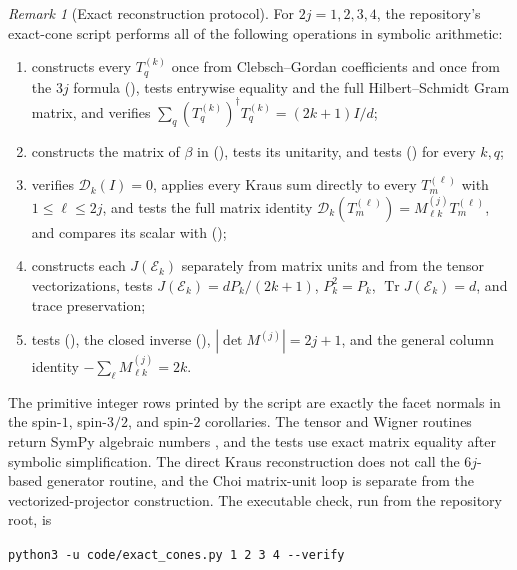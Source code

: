 \documentclass[twoside,10pt]{article}
\numberwithin{equation}{section}
\theoremstyle{slbody}
\theoremstyle{definition}
\theoremstyle{remark}
\newtheorem{remark}[theorem]{Remark}
\newcommand{\Tr}{\operatorname{Tr}}
\newcommand{\cD}{\mathcal D}
\newcommand{\cE}{\mathcal E}
\renewcommand{\eqref}[1]{%
  \textup{{\normalfont(\oldstylenums{\ref{#1}}}\normalfont)}}
\begin{document}
\begin{remark}[Exact reconstruction protocol]
For \(2j=1,2,3,4\), the repository's exact-cone script performs all of
the following operations in symbolic arithmetic:
\begin{enumerate}
 \item constructs every \(T_q^{(k)}\) once from Clebsch--Gordan
 coefficients and once from the \(3j\) formula
 \eqref{eq:tensor-definition}, tests entrywise equality and the full
 Hilbert--Schmidt Gram matrix, and verifies
 \(\sum_q(T_q^{(k)})^\dagger T_q^{(k)}=(2k+1)I/d\);
 \item constructs the matrix of \(\beta\) in
 \eqref{eq:dual-intertwiner}, tests its unitarity, and tests
 \eqref{eq:dual-tensor-phase} for every \(k,q\);
 \item verifies \(\cD_k(I)=0\), applies every Kraus sum directly to
 every \(T_m^{(\ell)}\) with \(1\leq\ell\leq2j\), and tests the full
 matrix identity
 \(\cD_k(T_m^{(\ell)})=M^{(j)}_{\ell k}T_m^{(\ell)}\), and compares
 its scalar with \eqref{eq:M-definition};
 \item constructs each \(J(\cE_k)\) separately from matrix units and
 from the tensor vectorizations, tests
 \(J(\cE_k)=dP_k/(2k+1)\), \(P_k^2=P_k\),
 \(\Tr J(\cE_k)=d\), and trace preservation;
 \item tests \eqref{eq:M-from-vertices}, the closed inverse
 \eqref{eq:M-inverse-formula}, \(|\det M^{(j)}|=2j+1\), and the
 general column identity \(-\sum_\ell M^{(j)}_{\ell k}=2k\).
\end{enumerate}
The primitive integer rows printed by the script are exactly the facet
normals in the spin-\(1\), spin-\(3/2\), and spin-\(2\) corollaries.
The tensor and Wigner routines return SymPy algebraic numbers
\cite{MeurerEtAl2017}, and the tests use exact matrix equality after
symbolic simplification.  The direct Kraus reconstruction does not call
the \(6j\)-based generator routine, and the Choi matrix-unit loop is
separate from the vectorized-projector construction.  The executable
check, run from the repository root, is
\begin{center}
 \verb|python3 -u code/exact_cones.py 1 2 3 4 --verify|
\end{center}
\end{remark}
\end{document}

